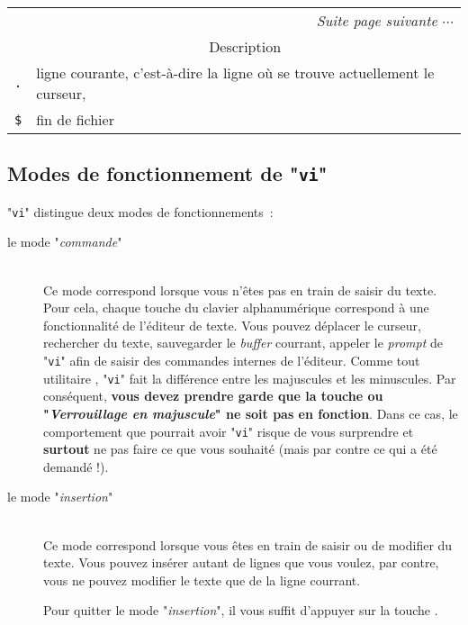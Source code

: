\begin{longtable}{|l|p{10cm}|}
	\multicolumn{2}{r}{{\sl Suite page suivante $\cdots$}}	\\
\endfoot
\endlastfoot
	\hline
		\multicolumn{1}{|c|}{Marqueur}				&
		\multicolumn{1}{|c|}{Description}			\\
	\hline \hline
		{\tt .}		&	ligne courante, c'est-{\`a}-dire la ligne o{\`u} se trouve
						actuellement le curseur,	\\
	\hline
		\verb=$=	&	fin de fichier				\\
	\hline
\end{longtable}

\subsection{\texorpdfstring{\label{ann-edt-vi-fcts}Modes de fonctionnement de "{\tt vi}"}{Modes de fonctionnement de "vi"}}

"{\tt vi}" distingue deux modes de fonctionnements~:
\begin{description}
	\item[{\rm le mode "{\sl commande}"}]\mbox{}\\
		Ce mode correspond lorsque vous n'{\^e}tes pas en train de saisir du texte.
		Pour cela, chaque touche du clavier alphanum{\'e}rique correspond {\`a} une
		fonctionnalit{\'e} de l'{\'e}diteur de texte. Vous pouvez d{\'e}placer le curseur,
		recher\-cher du texte, sauvegarder le {\sl buffer} courrant, appeler le
		{\sl prompt} de "{\tt vi}" afin de saisir des commandes
		internes de l'{\'e}diteur. Comme tout utilitaire {\Unix},
		"{\tt vi}" fait la diff{\'e}rence entre les majuscules et les minuscules.
		Par cons{\'e}quent, {\bf vous devez prendre garde que la touche 
		ou "{\sl Verrouillage en majuscule}" ne soit pas en fonction}. Dans
		ce cas, le comportement que pourrait avoir "{\tt vi}" risque de
		vous surprendre et {\bf surtout} ne pas faire ce que vous souhait{\'e} (mais
		par contre ce qui a {\'e}t{\'e} demand{\'e} !).\\[2ex]
	\item[{\rm le mode "{\sl insertion}"}]\mbox{}\\
		Ce mode correspond lorsque vous {\^e}tes en train de saisir ou de modifier
		du texte. Vous pouvez ins{\'e}rer autant de lignes que vous voulez, par contre,
		vous ne pouvez modifier le texte que de la ligne courrant.
		
		Pour quitter le mode "{\sl insertion}", il vous suffit d'appuyer
		sur la touche {\esckey}.
\end{description}

